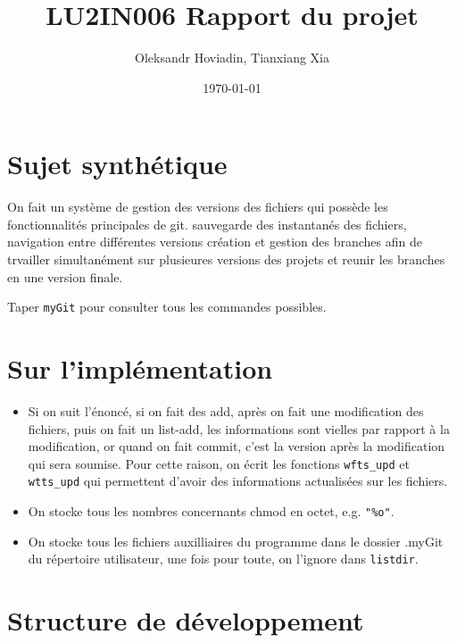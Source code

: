 \documentclass{report}
\title{LU2IN006 Rapport du projet}
\author{Oleksandr Hoviadin, Tianxiang Xia}
\date{\today}
\begin{document}
\maketitle
\section{Sujet synthétique}
On fait un système de gestion des versions des fichiers
qui possède les fonctionnalités principales de git. sauvegarde des instantanés
des fichiers, navigation entre différentes versions
création et gestion des branches afin de trvailler simultanément
sur plusieures versions des projets et reunir les branches
en une version finale.

Taper \verb|myGit| pour consulter tous les commandes possibles.
\section{Sur l'implémentation}
\begin{itemize}
  \item Si on suit l'énoncé, si on fait des add, après on fait une modification des fichiers,
  puis on fait un list-add, les informations sont vielles par rapport à la modification, or quand on
  fait commit, c'est la version après la modification qui sera soumise. Pour cette raison, on écrit les
  fonctions \verb|wfts_upd| et \verb|wtts_upd| qui permettent d'avoir des informations actualisées sur
  les fichiers.
  \item On stocke tous les nombres concernants chmod en octet, e.g. \verb|"%o"|.
  \item On stocke tous les fichiers auxilliaires du programme dans le dossier .myGit
  du répertoire utilisateur, une fois pour toute, on l'ignore dans \verb|listdir|.
\end{itemize}

\section{Structure de développement}
\end{document}
